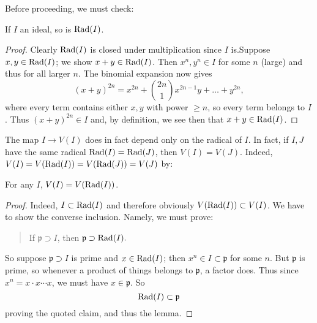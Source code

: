 Before proceeding, we must check:
\begin{lemma} 
If $I$ an ideal, so is $\operatorname{Rad}(I)$.
\end{lemma} 
\begin{proof} 
Clearly $\operatorname{Rad}(I)$ is closed under multiplication since $I$ is.Suppose $x,y \in \operatorname{Rad}(I)$; we show $x+y \in \operatorname{Rad}(I)$. Then $x^n,
y^n \in I$
for some $n$ (large) and thus for all larger $n$. The binomial
expansion now
gives
\[ (x+y)^{2n} = x^{2n} + \binom{2n}{1} x^{2n-1}y + \dots +
y^{2n}, \]
where every term contains either $x,y$ with power $ \geq n$, so
every term
belongs to $I$. Thus $(x+y)^{2n} \in I$ and, by definition, we
see then that $x+y \in \operatorname{Rad}(I)$.
\end{proof} 

The map $I \to V(I)$ does in fact depend only on the radical of
$I$. In fact, if $I,J$ have the same radical $\operatorname{Rad}(I) =
\operatorname{Rad}(J)$, then $V(I) = V(J)$.
Indeed, $V(I) = V(\operatorname{Rad}(I)) = V(\operatorname{Rad}(J)) = V(J)$ by:
\begin{lemma} 
For any $I$, $V(I) = V(\operatorname{Rad}(I))$.
\end{lemma} 
\begin{proof} 
Indeed, $I \subset \operatorname{Rad}(I)$ and therefore obviously $V(\operatorname{Rad}(I))
\subset V(I)$. We have to show the
converse inclusion. Namely, we must prove:
\begin{quote}
If $\mathfrak{p} \supset I$, then $\mathfrak{p} \supset
\operatorname{Rad}(I).$
\end{quote}
So suppose $\mathfrak{p} \supset I$ is prime and $x \in
\operatorname{Rad}(I)$; then $x^n \in I \subset \mathfrak{p}$ for some $n$.
But $\mathfrak{p}$ is prime, so whenever a product of things
belongs to
$\mathfrak{p}$, a factor does. Thus since $x^n = x \cdot x
\cdots x$, we must
have $x \in \mathfrak{p}$. So
\[ \operatorname{Rad}(I) \subset \mathfrak{p}  \]
proving the quoted claim, and thus the lemma.
\end{proof} 

